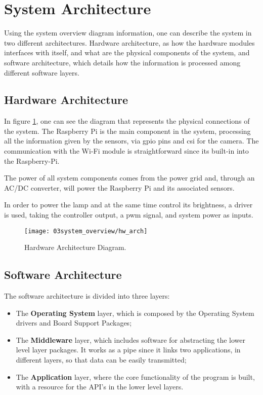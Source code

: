 \section{System Architecture}
Using the system overview diagram information, one can describe the system in two different architectures. Hardware architecture, as how the hardware modules interfaces with itself, and what are the physical components of the system, and software architecture, which details how the information is processed among different software layers.

\clearpage

\subsection{Hardware Architecture}
In figure \ref{fig:hw_arch}, one can see the diagram that represents the physical connections of the system. The Raspberry Pi is the main component in the system, processing all the information given by the sensors, via \ac{gpio} pins and \ac{csi} for the camera. The communication with the Wi-Fi module is straightforward since its built-in into the Raspberry-Pi.

The power of all system components comes from the power grid and, through an AC/DC converter, will power the Raspberry Pi and its associated sensors.

In order to power the lamp and at the same time control its brightness, a driver is used, taking the controller output, a \ac{pwm} signal, and system power as inputs. 

\begin{figure}[ht]
	\centering
	\texttt{[image: 03system\_overview/hw\_arch]}
	\caption{Hardware Architecture Diagram.}
	\label{fig:hw_arch}
\end{figure}

\subsection{Software Architecture}
The software architecture is divided into three layers:

\begin{itemize}
	\item The \textbf{Operating System} layer, which is composed by the Operating System drivers and Board Support Packages;
	\item The \textbf{Middleware} layer, which includes software for abstracting the lower level layer packages. It works as a pipe since it links two applications, in different layers, so that data can be easily transmitted;
	\item The \textbf{Application} layer, where the core functionality of the program is built, with a resource for the API's in the lower level layers.
\end{itemize}

